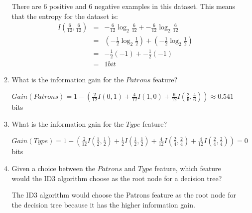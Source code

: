 \documentclass[--SOLUTION-OPTION--]{ditpaper}
\begin{document}
\begin{enumerate}
\begin{enumerate}
			\begin{answer}
					There are 6 positive and 6 negative examples in this dataset. This means that the entropy for the dataset is:
					\begin{eqnarray*}
						I(\frac{6}{12}, \frac{6}{12}) &=& -\frac{6}{12}\log_2\frac{6}{12} + -\frac{6}{12}\log_2 \frac{6}{12}\\
									~ &=& (-\frac{1}{2}\log_2\frac{1}{2}) + (-\frac{1}{2}\log_2\frac{1}{2}) \\ 
						~ &=&  -\frac{1}{2}(-1) + -\frac{1}{2}(-1) \\
						 ~ &=&  1bit
					\end{eqnarray*}			
			\end{answer}
		\item What is the information gain for the $Patrons$ feature?
			\begin{answer}
							$Gain(Patrons)=1- ( \frac{2}{12}I(0,1) + \frac{4}{12}I(1,0) + \frac{6}{12}I(\frac{2}{6},\frac{4}{6}) ) \approx 0.541$ bits
			\end{answer}
		\item What is the information gain for the $Type$ feature?
			\begin{answer}
							$Gain(Type)=1- ( \frac{2}{12}I(\frac{1}{2},\frac{1}{2}) + \frac{1}{2}I(\frac{1}{2},\frac{1}{2}) + \frac{4}{12}I(\frac{2}{4},\frac{2}{4})+ \frac{4}{12}I(\frac{2}{4},\frac{2}{4}) ) = 0$ bits
			\end{answer}
		\item Given a choice between the $Patrons$ and $Type$ feature, which feature would the ID3 algorithm choose as the root node for a decision tree?
			\begin{answer}
					The ID3 algorithm would choose the Patrons feature as the root node for the decision tree because it has the higher information gain.
			\end{answer}
	\end{enumerate}
\end{enumerate}

\newpage 
\end{document}
